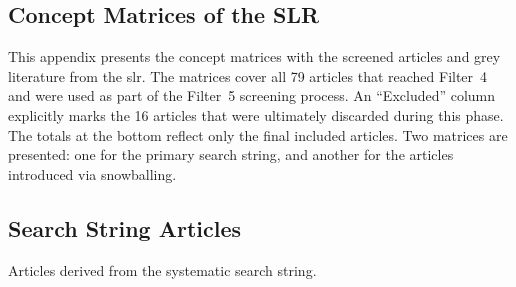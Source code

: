 \appendix
\begin{landscape}
	\chapter{Concept Matrices of the SLR}\label{appendixa}
	
	This appendix presents the concept matrices with the screened articles and grey literature from the \gls{slr}. The matrices cover all 79 articles that reached Filter~4 and were used as part of the Filter~5 screening process. An ``Excluded'' column explicitly marks the 16 articles that were ultimately discarded during this phase. The totals at the bottom reflect only the final included articles. Two matrices are presented: one for the primary search string, and another for the articles introduced via snowballing.

	\section{Search String Articles}\label{sec:search_string__articles_slr}

	Articles derived from the systematic search string.


\end{landscape}
